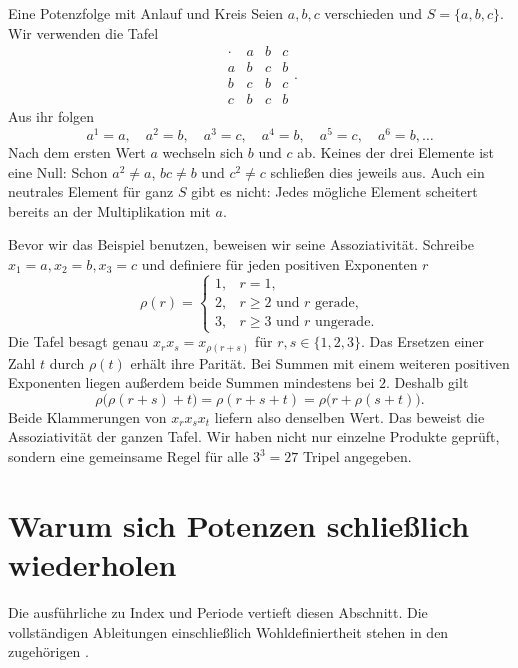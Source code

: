 \begin{FiniteSemigroupsReadingExample}{Eine Potenzfolge mit Anlauf und Kreis}
Seien \(a,b,c\) verschieden und \(S=\{a,b,c\}\). Wir verwenden die Tafel
\[
  \begin{array}{c|ccc}
    \cdot&a&b&c\\\hline
    a&b&c&b\\
    b&c&b&c\\
    c&b&c&b
  \end{array}.
\]
Aus ihr folgen
\[
  a^1=a,\quad a^2=b,\quad a^3=c,\quad a^4=b,\quad
  a^5=c,\quad a^6=b,\ldots
\]
Nach dem ersten Wert \(a\) wechseln sich \(b\) und \(c\) ab.
Keines der drei Elemente ist eine Null: Schon \(a^2\ne a\),
\(bc\ne b\) und \(c^2\ne c\) schließen dies jeweils aus.
Auch ein neutrales Element für ganz \(S\) gibt es nicht:
Jedes mögliche Element scheitert bereits an der Multiplikation mit \(a\).
\end{FiniteSemigroupsReadingExample}

Bevor wir das Beispiel benutzen, beweisen wir seine Assoziativität.
Schreibe \(x_1=a,x_2=b,x_3=c\) und definiere für jeden positiven
Exponenten \(r\)
\[
  \rho(r)=
  \begin{cases}
    1,&r=1,\\
    2,&r\geq2\text{ und }r\text{ gerade},\\
    3,&r\geq3\text{ und }r\text{ ungerade}.
  \end{cases}
\]
Die Tafel besagt genau \(x_rx_s=x_{\rho(r+s)}\) für
\(r,s\in\{1,2,3\}\). Das Ersetzen einer Zahl \(t\) durch \(\rho(t)\)
erhält ihre Parität. Bei Summen mit einem weiteren positiven Exponenten
liegen außerdem beide Summen mindestens bei \(2\). Deshalb gilt
\[
  \rho\bigl(\rho(r+s)+t\bigr)=\rho(r+s+t)
    =\rho\bigl(r+\rho(s+t)\bigr).
\]
Beide Klammerungen von \(x_rx_sx_t\) liefern also denselben Wert.
Das beweist die Assoziativität der ganzen Tafel. Wir haben nicht nur
einzelne Produkte geprüft, sondern eine gemeinsame Regel für alle
\(3^3=27\) Tripel angegeben.

\section*{Warum sich Potenzen schließlich wiederholen}
\hypertarget{finite-semigroups.reading.powers}{}

Die ausführliche \IndexPeriodReadingLink{} zu Index und Periode vertieft
diesen Abschnitt. Die vollständigen Ableitungen einschließlich
Wohldefiniertheit stehen in den zugehörigen \IndexPeriodProofsLink{}.

